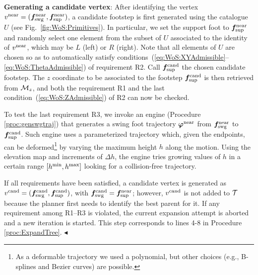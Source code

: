 {\bf Generating a candidate vertex}:  
After identifying the vertex $v^{\rm near}=({\bm{f}}_{\rm swg}^{\rm near},{\bm{f}}_{\rm sup}^{\rm near})$, a candidate footstep is first generated using the catalogue $U$ (see Fig.~\ref{fig:WoS:Primitives}). In particular, we set the support foot to ${\bm{f}}_{\rm sup}^{\rm near}$ and randomly select one element from the subset of $U$ associated to the identity of $v^{\rm near}$, which may be $L$ (left) or $R$ (right). Note that all elements of $U$ are chosen so as to automatically satisfy conditions~(\ref{eq:WoS:XYAdmissible}--\ref{eq:WoS:ThetaAdmissible}) of requirement R2.
Call ${\bm{f}}_{\rm sup}^{\rm cand}$ the chosen candidate footstep. The $z$ coordinate to be associated to the footstep ${\bm{f}}_{\rm sup}^{\rm cand}$ is then retrieved from ${\cal M}_{z}$, and both the requirement R1 and the last condition~(\ref{eq:WoS:ZAdmissible}) of R2 can now be checked.

To test the last requirement R3, we invoke an engine (Procedure \ref{proc:genswgtraj}) that generates a swing foot trajectory ${\bm{\varphi}}^{\rm near}$ from ${\bm{f}}_{\rm swg}^{\rm near}$ to ${\bm{f}}_{\rm sup}^{\rm cand}$. Such engine uses a parameterized trajectory which, given the endpoints, can be deformed\footnote{As a deformable trajectory we used a polynomial, but other choices (e.g., B-splines and Bezier curves) are possible.} by varying the maximum height $h$ along the motion. 
Using the elevation map and increments of $\Delta h$, the engine tries growing values of $h$ in a certain range $[h^{\rm min}, h^{\rm max}]$ looking for a collision-free trajectory.

If all requirements have been satisfied, a candidate vertex is generated as $v^{\rm cand} = ({\bm{f}}_{\rm swg}^{\rm cand}, {\bm{f}}_{\rm sup}^{\rm cand})$, with ${\bm{f}}_{\rm swg}^{\rm cand} = {\bm{f}}_{\rm sup}^{\rm near}$; however, $v^{\rm cand}$ is not added to $\cal T$ because the planner first needs to identify the best parent for it.
If any requirement among R1--R3 is violated, the current expansion attempt is aborted and a new iteration is started.
This step corresponds to lines 4-8 in Procedure \ref{proc:ExpandTree}.
\hfill $\blacktriangleleft$

